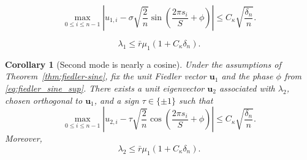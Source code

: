 \documentclass[10pt,a4paper]{amsart}
\newtheorem{corollary}{Corollary}
\begin{document}
	\begin{equation}
		\max_{0\le i\le n-1}
		\left|
		u_{1,i}-\sigma\sqrt{\frac2n}
		\sin\left(\frac{2\pi s_i}{S}+\phi\right)
		\right|
		\le
		C_\kappa\sqrt{\frac{\delta_n}{n}}.
	\end{equation}

	\begin{equation}
		\lambda_1\le \bar r\mu_1(1+C_\kappa\delta_n).
	\end{equation}

\begin{corollary}[Second mode is nearly a cosine]\label{cor:second-cosine}
	Under the assumptions of Theorem~\ref{thm:fiedler-sine}, fix the unit
	Fiedler vector $\boldsymbol{u}_1$ and the phase $\phi$ from
	\eqref{eq:fiedler_sine_sup}. There exists a unit eigenvector
	$\boldsymbol{u}_2$ associated with $\lambda_2$, chosen orthogonal to
	$\boldsymbol{u}_1$, and a sign $\tau\in\{\pm1\}$ such that
	\begin{equation}\label{eq:second_cosine_sup}
		\max_{0\le i\le n-1}
		\left|
		u_{2,i}-\tau\sqrt{\frac2n}
		\cos\left(\frac{2\pi s_i}{S}+\phi\right)
		\right|
		\le
		C_\kappa\sqrt{\frac{\delta_n}{n}}.
	\end{equation}
	Moreover,
	\begin{equation}\label{eq:lambda2_upper_for_later}
		\lambda_2\le \bar r\mu_1(1+C_\kappa\delta_n).
	\end{equation}
\end{corollary}
\end{document}
